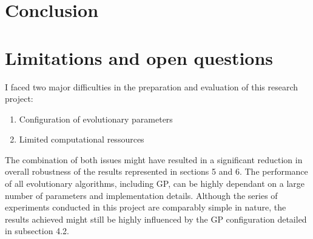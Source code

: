 \documentclass[
  12pt,
]{article}
\providecommand{\tightlist}{%
  \setlength{\itemsep}{0pt}\setlength{\parskip}{0pt}}
\begin{document}
\begin{table}[!h]

\caption{\label{tab:unnamed-chunk-10}Mean Size - P-Values}
\centering
{}
\end{table}

\hypertarget{conclusion}{%
\section{Conclusion}\label{conclusion}}

\hypertarget{limitations-and-open-questions}{%
\section{Limitations and open
questions}\label{limitations-and-open-questions}}

I faced two major difficulties in the preparation and evaluation of this
research project:

\begin{enumerate}
\def\labelenumi{\arabic{enumi}.}
\tightlist
\item
  Configuration of evolutionary parameters
\item
  Limited computational ressources
\end{enumerate}

The combination of both issues might have resulted in a significant
reduction in overall robustness of the results represented in sections 5
and 6. The performance of all evolutionary algorithms, including GP, can
be highly dependant on a large number of parameters and implementation
details. Although the series of experiments conducted in this project
are comparably simple in nature, the results achieved might still be
highly influenced by the GP configuration detailed in subsection 4.2.
\end{document}
